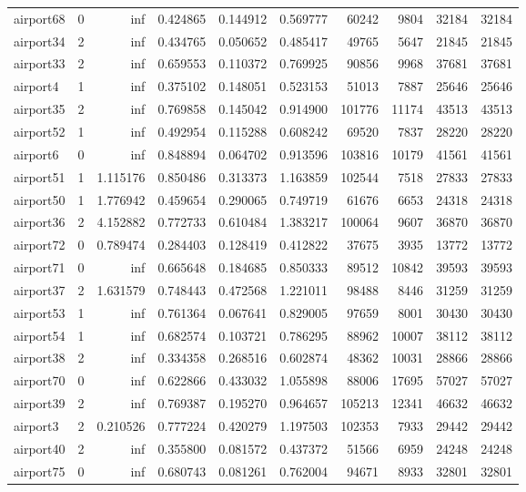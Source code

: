\documentclass[../../../thesis.tex]{subfiles}
\begin{document}
\begin{longtable}{|l|r|r|r|r|r|r|r|r|r|}
airport68 & 0 & inf & 0.424865 & 0.144912 & 0.569777 & 60242 & 9804 & 32184 & 32184 \\
airport34 & 2 & inf & 0.434765 & 0.050652 & 0.485417 & 49765 & 5647 & 21845 & 21845 \\
airport33 & 2 & inf & 0.659553 & 0.110372 & 0.769925 & 90856 & 9968 & 37681 & 37681 \\
airport4 & 1 & inf & 0.375102 & 0.148051 & 0.523153 & 51013 & 7887 & 25646 & 25646 \\
airport35 & 2 & inf & 0.769858 & 0.145042 & 0.914900 & 101776 & 11174 & 43513 & 43513 \\
airport52 & 1 & inf & 0.492954 & 0.115288 & 0.608242 & 69520 & 7837 & 28220 & 28220 \\
airport6 & 0 & inf & 0.848894 & 0.064702 & 0.913596 & 103816 & 10179 & 41561 & 41561 \\
airport51 & 1 & 1.115176 & 0.850486 & 0.313373 & 1.163859 & 102544 & 7518 & 27833 & 27833 \\
airport50 & 1 & 1.776942 & 0.459654 & 0.290065 & 0.749719 & 61676 & 6653 & 24318 & 24318 \\
airport36 & 2 & 4.152882 & 0.772733 & 0.610484 & 1.383217 & 100064 & 9607 & 36870 & 36870 \\
airport72 & 0 & 0.789474 & 0.284403 & 0.128419 & 0.412822 & 37675 & 3935 & 13772 & 13772 \\
airport71 & 0 & inf & 0.665648 & 0.184685 & 0.850333 & 89512 & 10842 & 39593 & 39593 \\
airport37 & 2 & 1.631579 & 0.748443 & 0.472568 & 1.221011 & 98488 & 8446 & 31259 & 31259 \\
airport53 & 1 & inf & 0.761364 & 0.067641 & 0.829005 & 97659 & 8001 & 30430 & 30430 \\
airport54 & 1 & inf & 0.682574 & 0.103721 & 0.786295 & 88962 & 10007 & 38112 & 38112 \\
airport38 & 2 & inf & 0.334358 & 0.268516 & 0.602874 & 48362 & 10031 & 28866 & 28866 \\
airport70 & 0 & inf & 0.622866 & 0.433032 & 1.055898 & 88006 & 17695 & 57027 & 57027 \\
airport39 & 2 & inf & 0.769387 & 0.195270 & 0.964657 & 105213 & 12341 & 46632 & 46632 \\
airport3 & 2 & 0.210526 & 0.777224 & 0.420279 & 1.197503 & 102353 & 7933 & 29442 & 29442 \\
airport40 & 2 & inf & 0.355800 & 0.081572 & 0.437372 & 51566 & 6959 & 24248 & 24248 \\
airport75 & 0 & inf & 0.680743 & 0.081261 & 0.762004 & 94671 & 8933 & 32801 & 32801 \\

\end{longtable}
\end{document}
